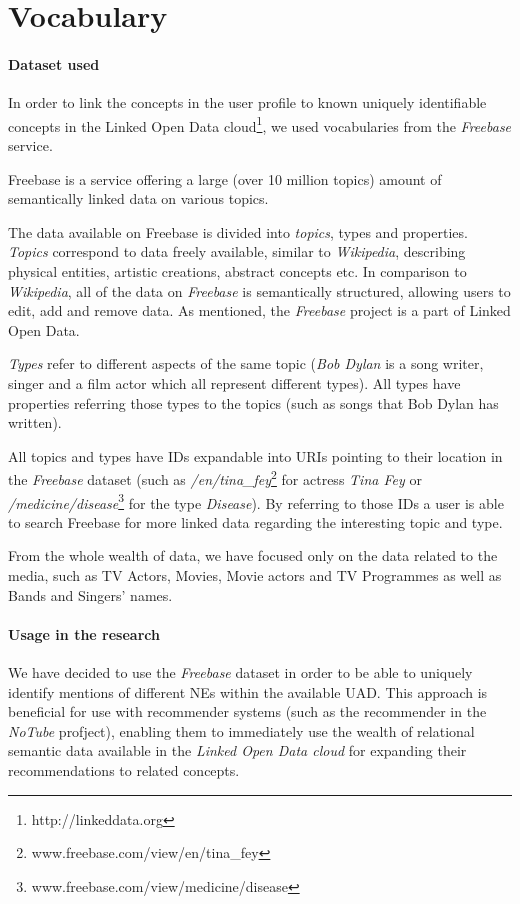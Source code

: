 \section{Vocabulary}

\paragraph{Dataset used}
In order to link the concepts in the user profile to known uniquely identifiable concepts in the Linked Open Data
cloud\footnote{http://linkeddata.org}, we used vocabularies from the \textit{Freebase} service.

Freebase is a service offering a large (over 10 million topics) amount of semantically linked data on various topics.

The data available on Freebase is divided into \textit{topics}, types and properties. \textit{Topics} correspond to data
freely available, similar to \textit{Wikipedia}, describing physical entities, artistic creations, abstract concepts
etc. In comparison to \textit{Wikipedia}, all of the data on \textit{Freebase} is semantically structured,
allowing users to edit, add and remove data. As mentioned, the \textit{Freebase} project is a part of Linked Open Data.

\textit{Types} refer to different aspects of the same topic (\eg \textit{Bob Dylan} is a song writer,
singer and a film actor which all represent different types). All types have properties referring those
types to the topics (such as songs that Bob Dylan has written).

All topics and types have IDs expandable into URIs pointing to their location in the \textit{Freebase} dataset
(such as \textit{/en/tina\_fey}\footnote{www.freebase.com/view/en/tina\_fey} for actress \textit{Tina Fey}
or \textit{/medicine/disease}\footnote{www.freebase.com/view/medicine/disease} for the type \textit{Disease}).
By referring to those IDs a user is able to search Freebase for more linked data regarding the interesting topic and type.

From the whole wealth of data, we have focused only on the data related to the media, such as TV Actors, Movies, Movie
actors and TV Programmes as well as Bands and Singers' names.

\paragraph{Usage in the research}
We have decided to use the \textit{Freebase} dataset in order to be able to uniquely identify mentions of different NEs
within the available UAD. This approach is beneficial for use with recommender systems (such as the recommender
in the \textit{NoTube} profject), enabling them to immediately use the wealth of relational semantic data available
in the \textit{Linked Open Data cloud} for expanding their recommendations to related concepts.
